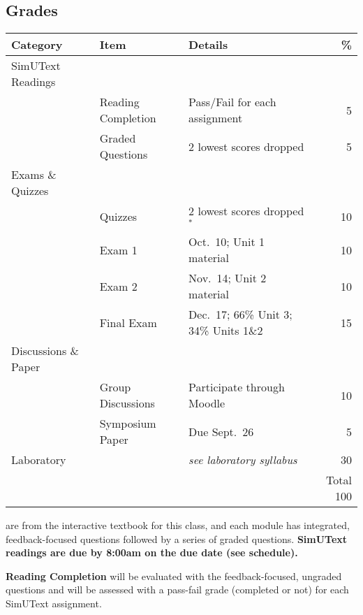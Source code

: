 \documentclass{tufte-handout}
\begin{document}
\begin{fullwidth}
\section{Grades}


\begin{table}
\begin{tabular}{l l l r}
Category & Item & Details & \% \\
\hline
SimUText Readings & \\
& Reading Completion & Pass/Fail for each assignment & 5 \\
& Graded Questions & 2 lowest scores dropped & 5 \\
\hline
Exams \& Quizzes \\
& Quizzes & 2 lowest scores dropped$^*$ & 10 \\
& Exam 1 & Oct.~10; Unit 1 material & 10 \\
& Exam 2 & Nov.~14; Unit 2 material & 10 \\
& Final Exam & Dec.~17; 66\% Unit 3; 34\% Units 1\&2 & 15 \\ 							%
\hline 
Discussions \& Paper \\
& Group Discussions & Participate through Moodle & 10 \\
 & Symposium Paper & Due Sept.~26 & 5 \\
\hline
Laboratory & & \emph{see laboratory syllabus} & 30 \\
\hline
& & & Total 100
\end{tabular}
\end{table}

\end{fullwidth}

 are from the interactive textbook for this class, and each module has integrated, feedback-focused questions followed by a series of graded questions. \textbf{SimUText readings are due by 8:00am on the due date (see schedule).} 

\textbf{Reading Completion} will be evaluated with the feedback-focused, ungraded questions and will be assessed with a pass-fail grade (completed or not) for each SimUText assignment. 
\end{document}
